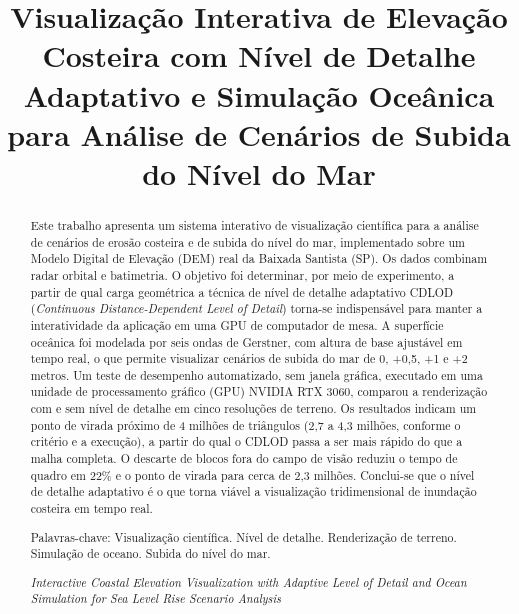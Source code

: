 \documentclass[conference]{IEEEtran}
\begin{document}
\title{Visualização Interativa de Elevação Costeira com Nível de Detalhe
Adaptativo e Simulação Oceânica para Análise de Cenários de Subida do
Nível do Mar}

\author{
}

\maketitle

\begin{abstract}
Este trabalho apresenta um sistema interativo de visualização científica
para a análise de cenários de erosão costeira e de subida do nível do mar,
implementado sobre um Modelo Digital de Elevação (DEM) real da Baixada
Santista (SP). Os dados combinam radar orbital e batimetria.  O objetivo foi determinar, por meio
de experimento, a partir de qual carga geométrica a técnica de nível de
detalhe adaptativo CDLOD (\emph{Continuous Distance-Dependent Level of
Detail}) torna-se indispensável para manter a interatividade da aplicação em uma GPU de computador de mesa. A superfície oceânica
foi modelada por seis ondas de Gerstner, com altura de base ajustável em
tempo real, o que permite visualizar cenários de subida do mar de 0, +0,5,
+1 e +2 metros. Um teste de desempenho automatizado, sem janela gráfica,
executado em uma unidade de processamento gráfico (GPU) NVIDIA RTX 3060,
comparou a renderização com e sem nível de detalhe em cinco resoluções de
terreno. Os resultados indicam um ponto de virada próximo de 4 milhões de triângulos (2,7 a 4,3 milhões, conforme o critério e a execução), a partir do qual o CDLOD passa a ser mais rápido do que a malha completa. O descarte de blocos fora do campo de visão reduziu o tempo de quadro em 22\% e o ponto de virada para cerca de 2,3 milhões. Conclui-se que o nível de detalhe adaptativo é o que
torna viável a visualização tridimensional de inundação costeira em tempo
real.

Palavras-chave: Visualização científica. Nível de detalhe. Renderização de
terreno. Simulação de oceano. Subida do nível do mar.

\textit{Interactive Coastal Elevation Visualization with Adaptive Level of
Detail and Ocean Simulation for Sea Level Rise Scenario Analysis}


\end{abstract}
\end{document}
